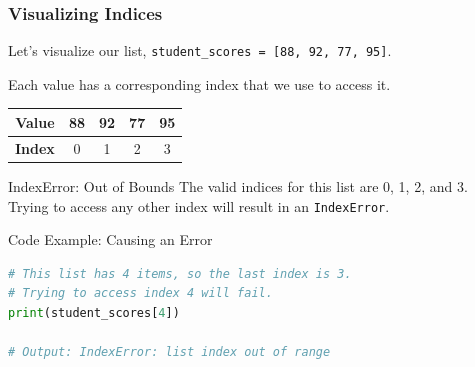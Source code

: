 \documentclass{beamer}
\begin{document}
\begin{frame}[fragile]
    \frametitle{Visualizing Indices}
    
    Let's visualize our list, \texttt{student\_scores = [88, 92, 77, 95]}.
    \vspace{0.5cm}
    
    Each value has a corresponding index that we use to access it.
    
    \begin{center}
    \begin{tabular}{|c|c|c|c|c|}
        \hline
        \textbf{Value} & 88 & 92 & 77 & 95 \\
        \hline
        \textbf{Index} & 0 & 1 & 2 & 3 \\
        \hline
    \end{tabular}
    \end{center}
    
    \pause
    \vspace{0.5cm}
    
    \begin{alertblock}{IndexError: Out of Bounds}
        The valid indices for this list are 0, 1, 2, and 3. Trying to access any other index will result in an \texttt{IndexError}.
    \end{alertblock}
    
    \begin{exampleblock}{Code Example: Causing an Error}
\begin{lstlisting}[language=Python]
# This list has 4 items, so the last index is 3.
# Trying to access index 4 will fail.
print(student_scores[4])

# Output: IndexError: list index out of range
\end{lstlisting}
    \end{exampleblock}
    
\end{frame}
\end{document}
